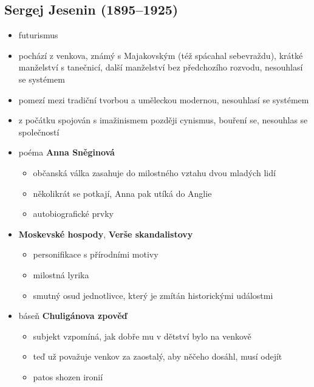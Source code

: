\subsection{Sergej Jesenin (1895--1925)}
\begin{itemize}
\item futurismus
\item pochází z venkova, známý s Majakovským (též spácahal sebevraždu), krátké manželství s tanečnicí, další manželství bez předchozího rozvodu, nesouhlasí se systémem
\item pomezí mezi tradiční tvorbou a uměleckou modernou, nesouhlasí se systémem
\item z počátku spojován s imažinismem \ra později cynismus, bouření se, nesouhlas se společností
\item poéma \textbf{Anna Sněginová}
	\begin{itemize}
	\item občanská válka zasahuje do milostného vztahu dvou mladých lidí
	\item několikrát se potkají, Anna pak utíká do Anglie
	\item autobiografické prvky
	\end{itemize}
\item \textbf{Moskevské hospody}, \textbf{Verše skandalistovy}
	\begin{itemize}
	\item personifikace s přírodními motivy
	\item milostná lyrika
	\item smutný osud jednotlivce, který je zmítán historickými událostmi
	\end{itemize}
\item báseň \textbf{Chuligánova zpověď}
	\begin{itemize}
	\item subjekt vzpomíná, jak dobře mu v dětství bylo na venkově
	\item teď už považuje venkov za zaostalý, aby něčeho dosáhl, musí odejít
	\item patos \ra shozen ironií
	\end{itemize}
\end{itemize}

